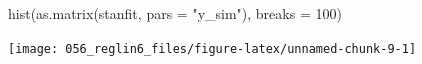 \documentclass[
  10pt,
  italian,
  a4paper,
  extrafontsizes,onecolumn,openright
  ]{memoir}
\newenvironment{Shaded}{\begin{snugshade}}{\end{snugshade}}
\newcommand{\AttributeTok}[1]{\textcolor[rgb]{0.77,0.63,0.00}{#1}}
\newcommand{\DecValTok}[1]{\textcolor[rgb]{0.00,0.00,0.81}{#1}}
\newcommand{\FunctionTok}[1]{\textcolor[rgb]{0.00,0.00,0.00}{#1}}
\newcommand{\NormalTok}[1]{#1}
\newcommand{\OtherTok}[1]{\textcolor[rgb]{0.56,0.35,0.01}{#1}}
\newcommand{\SpecialCharTok}[1]{\textcolor[rgb]{0.00,0.00,0.00}{#1}}
\newcommand{\StringTok}[1]{\textcolor[rgb]{0.31,0.60,0.02}{#1}}
\begin{document}
\begin{Shaded}
\end{Shaded}

\begin{Shaded}
\begin{Highlighting}[]
\FunctionTok{hist}\NormalTok{(}\FunctionTok{as.matrix}\NormalTok{(stanfit, }\AttributeTok{pars =} \StringTok{"y\_sim"}\NormalTok{), }\AttributeTok{breaks =} \DecValTok{100}\NormalTok{)}
\end{Highlighting}
\end{Shaded}

\begin{center}\texttt{[image: 056\_reglin6\_files/figure-latex/unnamed-chunk-9-1]} \end{center}
\end{document}
